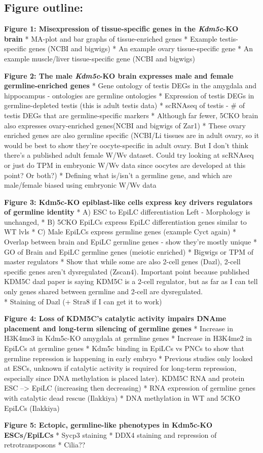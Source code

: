 \documentclass[
]{article}
\begin{document}
\newpage

\hypertarget{figure-outline}{%
\subsection{Figure outline:}\label{figure-outline}}

\textbf{Figure 1: Misexpression of tissue-specific genes in the
\emph{Kdm5c}-KO brain} * MA-plot and bar graphs of tissue-enriched genes
* Example testis-specific genes (NCBI and bigwigs) * An example ovary
tissue-specific gene * An example muscle/liver tissue-specific gene
(NCBI and bigwigs)

\textbf{Figure 2: The male \emph{Kdm5c}-KO brain expresses male and
female germline-enriched genes} * Gene ontology of testis DEGs in the
amygdala and hippocampus - ontologies are germline ontologies *
Expression of testis DEGs in germline-depleted testis (this is adult
testis data) * scRNAseq of testis - \# of testis DEGs that are
germline-specific markers * Although far fewer, 5CKO brain also
expresses ovary-enriched genes(NCBI and bigwigs of Zar1) * These ovary
enriched genes are also germline specific (NCBI/Li tissues are in adult
ovary, so it would be best to show they're oocyte-specific in adult
ovary. But I don't think there's a published adult female W/Wv dataset.
Could try looking at scRNAseq or just do TPM in embryonic W/Wv data
since oocytes are developed at this point? Or both?) * Defining what
is/isn't a germline gene, and which are male/female biased using
embryonic W/Wv data

\textbf{Figure 3: Kdm5c-KO epiblast-like cells express key drivers
regulators of germline identity} * A) ESC to EpiLC differentiation Left
- Morphology is unchanged, * B) 5CKO EpiLCs express EpiLC
differentiation genes similar to WT lvls * C) Male EpiLCs express
germline genes (example Cyct again) * Overlap between brain and EpiLC
germline genes - show they're mostly unique * GO of Brain and EpiLC
germline genes (meiotic enriched) * Bigwigs or TPM of master regulators
* Show that while some are also 2-cell genes (Dazl), 2-cell specific
genes aren't dysregulated (Zscan4). Important point because published
KDM5C dazl paper is saying KDM5C is a 2-cell regulator, but as far as I
can tell only genes shared between germline and 2-cell are
dysregulated.\\
* Staining of Dazl (+ Stra8 if I can get it to work)

\textbf{Figure 4: Loss of KDM5C's catalytic activity impairs DNAme
placement and long-term silencing of germline genes} * Increase in
H3K4me3 in Kdm5c-KO amygdala at germline genes * Increase in H3K4me2 in
EpiLCs at germline genes * Kdm5c binding in EpiLCs vs PNCs to show that
germline repression is happening in early embryo * Previous studies only
looked at ESCs, unknown if catalytic activity is required for long-term
repression, especially since DNA methylation is placed later). KDM5C RNA
and protein ESC --\textgreater{} EpiLC (increasing then decreasing) *
RNA expression of germline genes with catalytic dead rescue (Ilakkiya) *
DNA methylation in WT and 5CKO EpiLCs (Ilakkiya)

\textbf{Figure 5: Ectopic, germline-like phenotypes in Kdm5c-KO
ESCs/EpiLCs} * Sycp3 staining * DDX4 staining and repression of
retrotransposons * Cilia??
\end{document}
